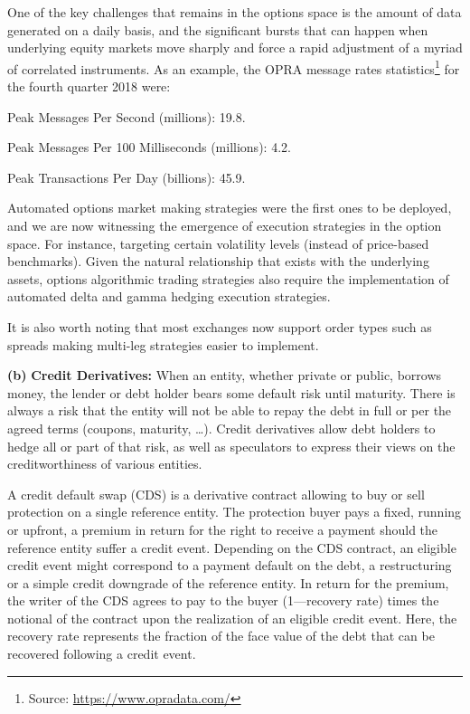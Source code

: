 One of the key challenges that remains in the options space is the amount of data generated on a daily basis, and the significant bursts that can happen when underlying equity markets move sharply and force a rapid adjustment of a myriad of correlated instruments. As an example, the OPRA message rates statistics\footnote{Source: \url{https://www.opradata.com/}} for the fourth quarter 2018 were: \twomedskip

\noindent Peak Messages Per Second (millions): 19.8.

\noindent Peak Messages Per 100 Milliseconds (millions): 4.2.

\noindent Peak Transactions Per Day (billions): 45.9. \twomedskip


Automated options market making strategies were the first ones to be deployed, and we are now witnessing the emergence of execution strategies in the option space. For instance, targeting certain volatility levels (instead of price-based benchmarks). Given the natural relationship that exists with the underlying assets, options algorithmic trading strategies also require the implementation of automated delta and gamma hedging execution strategies.


It is also worth noting that most exchanges now support order types such as spreads making multi-leg strategies easier to implement. \twomedskip


\noindent\textbf{(b)} \textbf{Credit Derivatives:} When an entity, whether private or public, borrows money, the lender or debt holder bears some default risk until maturity. There is always a risk that the entity will not be able to repay the debt in full or per the agreed terms (coupons, maturity, \dots). Credit derivatives allow debt holders to hedge all or part of that risk, as well as speculators to express their views on the creditworthiness of various entities. 


A credit default swap (CDS) is a derivative contract allowing to buy or sell protection on a single reference entity. The protection buyer pays a fixed, running or upfront, a premium in return for the right to receive a payment should the reference entity suffer a credit event. Depending on the CDS contract, an eligible credit event might correspond to a payment default on the debt, a restructuring or a simple credit downgrade of the reference entity. In return for the premium, the writer of the CDS agrees to pay to the buyer (1---recovery rate) times the notional of the contract upon the realization of an eligible credit event. Here, the recovery rate represents the fraction of the face value of the debt that can be recovered following a credit event.


